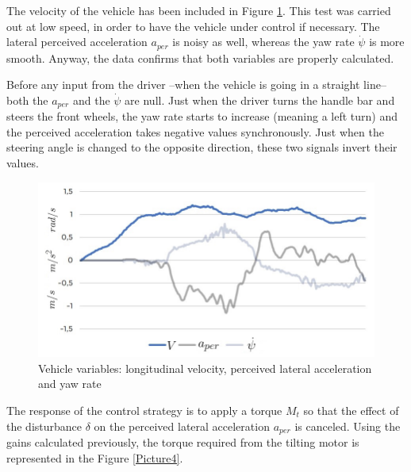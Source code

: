 The velocity of the vehicle has been included in Figure \ref{Picture2}. This test was carried out at low speed, in order to have the vehicle under control if necessary. The lateral perceived acceleration $a_{per}$ is noisy as well, whereas the yaw rate $\dot{\psi}$ is more smooth. Anyway, the data confirms that both variables are properly calculated. 

Before any input from the driver --when the vehicle is going in a straight line-- both the $a_{per}$ and the $\dot{\psi}$ are null. Just when the driver turns the handle bar and steers the front wheels, the yaw rate starts to increase (meaning a left turn) and the perceived acceleration takes negative values synchronously. Just when the steering angle is changed to the opposite direction, these two signals invert their values.

\begin{figure}[!h]
	\includegraphics[width=1\linewidth]{figs/06/tests/Picture2b}
	\caption{Vehicle variables: longitudinal velocity, perceived lateral acceleration and yaw rate}
	\label{Picture2}
\end{figure}

The response of the control strategy is to apply a torque $M_{t}$ so that the effect of the disturbance $\delta$ on the perceived lateral acceleration $a_{per}$ is canceled. Using the gains calculated previously, the torque required from the tilting motor is represented in the Figure \ref{Picture4}. 


